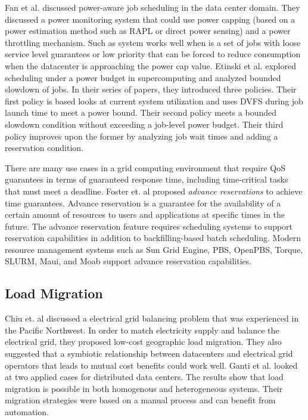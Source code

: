 Fan et al. \cite{PowerAwareServer1} discussed power-aware job scheduling in the data center domain. 
They discussed a power monitoring system that could use power capping (based on a power estimation method such as RAPL or direct power sensing) and a power throttling mechanism. Such as system works well when is a set of jobs with loose service level guarantees or low priority that can be
forced to reduce consumption when the datacenter is approaching the power cap value. Etinski et al. \cite{Etinski1,Etinski2,Etinski3,Etinski4} explored scheduling under a power budget in supercomputing and analyzed bounded slowdown of jobs. In their series of papers, they introduced three policies. Their first policy is based looks at current system utilization and uses DVFS during job launch time to meet a power bound. Their second policy meets a bounded slowdown condition without exceeding a job-level power budget. Their third policy improves upon the former by analyzing job wait times and adding a reservation condition. 

There are many use cases in a grid computing environment that require QoS
guarantees in terms of guaranteed response time, including time-critical
tasks that must meet a deadline. Foster et. al \cite{foster_distributed_1999,foster_anatomy_2001} proposed \emph{advance reservations} to achieve time guarantees. Advance reservation is a guarantee for the availability of a certain amount of resources to users and applications at specific times in the future. The advance reservation feature requires scheduling systems to support reservation capabilities in addition to backfilling-based batch scheduling. Modern resource management systems such as Sun Grid Engine, PBS, OpenPBS, Torque, SLURM, Maui, and Moab support advance reservation capabilities.

\subsection{Load Migration}
Chiu et. al \cite{chiu_electric_2012} discussed a electrical grid balancing problem that was experienced in the Pacific Northwest. In order to match electricity supply and balance the electrical grid, they proposed low-cost geographic load migration. They also suggested that a symbiotic relationship between datacenters and electrical grid operators that leads to mutual cost benefits could work well.  Ganti et al. \cite{Ghatikar2012b} looked at two applied cases for distributed data centers. The results show that load migration is possible in both homogenous and heterogeneous systems. Their migration strategies were based on a manual process and can benefit from automation.


